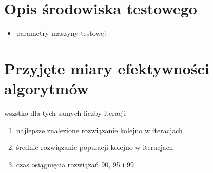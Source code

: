 \section{Opis środowiska testowego}
\begin{itemize}
\item parametry maszyny testowej

\end{itemize}


\section{Przyjęte miary efektywności algorytmów}
\label{sec:przyjete_miary_efektywnosci_algorytmow}
wszstko dla tych samych liczby iteracji
\begin{enumerate}
\item najlepsze znalezione rozwiązanie kolejno w iteracjach
\item średnie rozwiązanie populacji kolejno w iteracjach
\item czas osiągnięcia rozwiązań 90, 95 i 99%

\end{enumerate}
